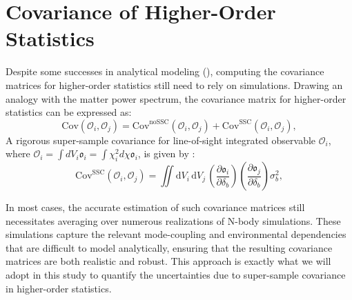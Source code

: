 \section{Covariance of Higher-Order Statistics}
Despite some successes in analytical modeling (\citealt{2018PhRvD..97d3532C, 2018A&A...611A..83L, 2019A&A...624A..61L, 2023OJAp....6E...1U}), computing the covariance matrices for higher-order statistics  still need to rely on simulations. Drawing an analogy with the matter power spectrum, the covariance matrix for higher-order statistics can be expressed as:
\begin{equation}
    \mathrm{Cov}(\mathcal{O}_i, \mathcal{O}_j) = \mathrm{Cov}^{\mathrm{noSSC}}(\mathcal{O}_i, \mathcal{O}_j) + \mathrm{Cov}^{\mathrm{SSC}}(\mathcal{O}_i, \mathcal{O}_j),
\end{equation}
A rigorous super-sample covariance for line-of-sight integrated observable $\mathcal{O}_i$, where $\mathcal{O}_i = \int dV_i \mathfrak{o}_i = \int \chi_i^2 d\chi \mathfrak{o}_i$, is given by \citep{2016JCAP...08..005L}:
\begin{equation}
    \mathrm{Cov}^{\mathrm{SSC}}(\mathcal{O}_i, \mathcal{O}_j) = 
    \iint \mathrm{d}V_i \, \mathrm{d}V_j \,
    \left(
        \frac{\partial \mathfrak{o}_i}{\partial \delta_b}
    \right)
    \left(
        \frac{\partial \mathfrak{o}_j}{\partial \delta_b}
    \right)
    \sigma_b^2, 
\end{equation}

In most cases, the accurate estimation of such covariance matrices still necessitates averaging over numerous realizations of N-body simulations. These simulations capture the relevant mode-coupling and environmental dependencies that are difficult to model analytically, ensuring that the resulting covariance matrices are both realistic and robust. This approach is exactly what we will adopt in this study to quantify the uncertainties due to super-sample covariance in higher-order statistics. 